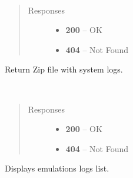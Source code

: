 \documentclass[letterpaper,10pt,english]{sphinxmanual}
\begin{document}
\begin{fulllineitems}
\label{01_how_to_use_it:method-get-logs-system}~\begin{quote}\begin{description}
\item[{Responses}] \leavevmode\begin{itemize}
\item {} 
\textbf{200} -- OK

\item {} 
\textbf{404} -- Not Found

\end{itemize}

\end{description}\end{quote}

Return Zip file with system logs.

\end{fulllineitems}


\begin{fulllineitems}
\label{01_how_to_use_it:method-get-logs-emulations}~\begin{quote}\begin{description}
\item[{Responses}] \leavevmode\begin{itemize}
\item {} 
\textbf{200} -- OK

\item {} 
\textbf{404} -- Not Found

\end{itemize}

\end{description}\end{quote}

Displays emulations logs list.

\end{fulllineitems}

\end{document}
